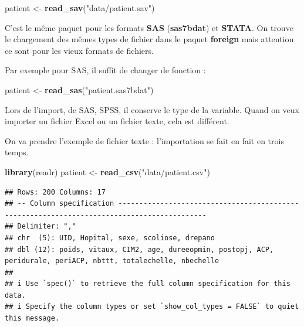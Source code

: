 \documentclass[
]{book}
\newenvironment{Shaded}{\begin{snugshade}}{\end{snugshade}}
\newcommand{\FunctionTok}[1]{\textcolor[rgb]{0.13,0.29,0.53}{\textbf{#1}}}
\newcommand{\NormalTok}[1]{#1}
\newcommand{\OtherTok}[1]{\textcolor[rgb]{0.56,0.35,0.01}{#1}}
\newcommand{\SpecialCharTok}[1]{\textcolor[rgb]{0.81,0.36,0.00}{\textbf{#1}}}
\newcommand{\StringTok}[1]{\textcolor[rgb]{0.31,0.60,0.02}{#1}}
\begin{document}
\begin{Shaded}
\begin{Highlighting}[]
\NormalTok{patient }\OtherTok{\textless{}{-}} \FunctionTok{read\_sav}\NormalTok{(}\StringTok{"data/patient.sav"}\NormalTok{)}
\end{Highlighting}
\end{Shaded}

C'est le même paquet pour les formats \textbf{SAS} (\textbf{sas7bdat}) et \textbf{STATA}. On
trouve le chargement des mêmes types de fichier dans le paquet \textbf{foreign}
mais attention ce sont pour les vieux formats de fichiers.

Par exemple pour SAS, il suffit de changer de fonction :

\begin{Shaded}
\begin{Highlighting}[]
\NormalTok{patient }\OtherTok{\textless{}{-}} \FunctionTok{read\_sas}\NormalTok{(}\StringTok{"patient.sas7bdat"}\NormalTok{)}
\end{Highlighting}
\end{Shaded}

Lors de l'import, de SAS, SPSS, il conserve le type de la variable. Quand on veux
importer un fichier Excel ou un fichier texte, cela est différent.

On va prendre l'exemple de fichier texte : l'importation se fait en fait en
trois temps.

\begin{Shaded}
\begin{Highlighting}[]
\FunctionTok{library}\NormalTok{(readr)}
\NormalTok{patient }\OtherTok{\textless{}{-}} \FunctionTok{read\_csv}\NormalTok{(}\StringTok{"data/patient.csv"}\NormalTok{)}
\end{Highlighting}
\end{Shaded}

\begin{verbatim}
## Rows: 200 Columns: 17
## -- Column specification -------------------------------------------------------------------------------------------
## Delimiter: ","
## chr  (5): UID, Hopital, sexe, scoliose, drepano
## dbl (12): poids, vitaux, CIM2, age, dureeopmin, postopj, ACP, peridurale, periACP, nbttt, totalechelle, nbechelle
## 
## i Use `spec()` to retrieve the full column specification for this data.
## i Specify the column types or set `show_col_types = FALSE` to quiet this message.
\end{verbatim}

\begin{Shaded}
\end{Shaded}
\end{document}

